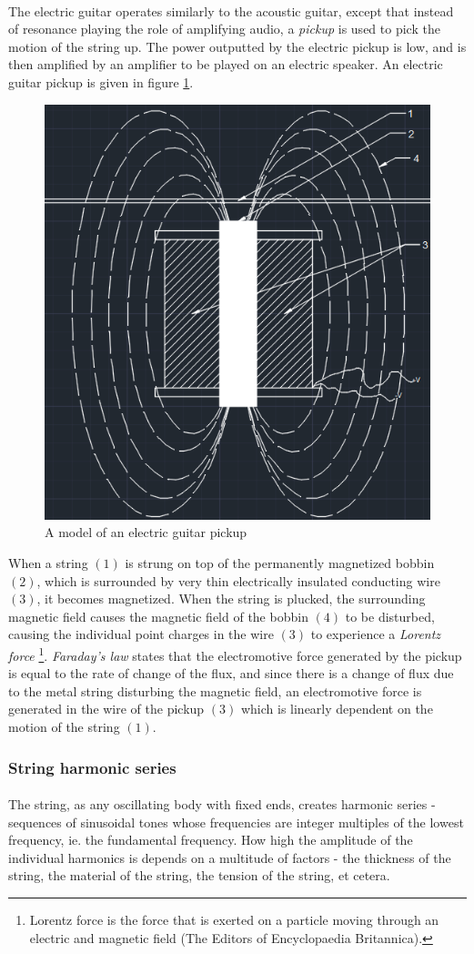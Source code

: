 \documentclass{article}
\begin{document}
\paragraph*{}
The electric guitar operates similarly to the acoustic guitar, except that 
instead of resonance playing the role of amplifying audio, a \textit{pickup} 
is used to pick the motion of the string up. The power outputted by the 
electric pickup is low, and is then amplified by an amplifier to be played on 
an electric speaker. An electric guitar pickup is given in figure 
\ref{fig:pickup}. 
\begin{figure}[ht]
	\centering
	\includegraphics[width=.4\textwidth]{img/pickup}
	\caption{A model of an electric guitar pickup}
	\label{fig:pickup}
\end{figure}
When a string $(1)$ is strung on top of the permanently magnetized bobbin 
$(2)$, which is surrounded by very thin electrically insulated conducting wire 
$(3)$, it becomes magnetized. When the string is plucked, the surrounding 
magnetic field causes the magnetic field of the bobbin $(4)$ to be disturbed, 
causing the individual point charges in the wire $(3)$ to experience a 
\textit{Lorentz force}
\footnote{Lorentz force is the force that is exerted on a particle moving 
	through an electric and magnetic field (The Editors of Encyclopaedia 
Britannica).}. \textit{Faraday's law} states that the electromotive force
generated by the pickup is equal to the rate of change of the flux, and since
there is a change of flux due to the metal string disturbing the magnetic
field, an electromotive force is generated in the wire of the pickup $(3)$ 
which is linearly dependent on the motion of the string $(1)$.

\subsubsection{String harmonic series}
\paragraph*{} 
The string, as any oscillating body with fixed ends, creates harmonic series - 
sequences of sinusoidal tones whose frequencies are integer multiples of the 
lowest frequency, ie. the fundamental frequency. How high the amplitude of the 
individual harmonics is depends on a multitude of factors - the thickness of 
the string, the material of the string, the tension of the string, et cetera.
\end{document}
